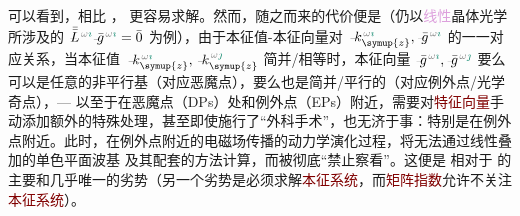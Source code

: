 可以看到，相比 ，  更容易求解。然而，随之而来的代价便是（仍以\textcolor{Plum}{线性}\textcolor{PineGreen}{晶体光学}所涉及的 $\Xint{\mathcolor{gray}{-}}{30}{\bar{\bar{L}}}^{\;\! \mathcolor{gray}{\omega} \textcolor{PineGreen}{\imath}} \Xint{{}^{}_{\mathcolor{gray}{-}}}{10}{\bar{g}}^{\;\!\mathcolor{gray}{\omega} \textcolor{PineGreen}{\imath}} = \bar{0}$ 为例），由于\textcolor{PineGreen}{本征值}-\textcolor{PineGreen}{本征向量}对 $\Xint{\begin{smallmatrix} ~ \\ {}^{}_{\mathcolor{gray}{-}} \\ ~ \end{smallmatrix}}{15}{k}_{\symup{z}}^{\;\! \mathcolor{gray}{\omega} \textcolor{PineGreen}{\imath}}, \Xint{{}^{}_{\mathcolor{gray}{-}}}{10}{\bar{g}}^{\;\!\mathcolor{gray}{\omega} \textcolor{PineGreen}{\imath}}$ 的一一对应关系，当\textcolor{PineGreen}{本征值} $\Xint{\begin{smallmatrix} ~ \\ {}^{}_{\mathcolor{gray}{-}} \\ ~ \end{smallmatrix}}{15}{k}_{\symup{z}}^{\;\! \mathcolor{gray}{\omega} \textcolor{PineGreen}{\imath}}, \Xint{\begin{smallmatrix} ~ \\ {}^{}_{\mathcolor{gray}{-}} \\ ~ \end{smallmatrix}}{15}{k}_{\symup{z}}^{\;\! \mathcolor{gray}{\omega} \textcolor{PineGreen}{\jmath}}$ 简并/相等时，\textcolor{PineGreen}{本征向量} $\Xint{{}^{}_{\mathcolor{gray}{-}}}{10}{\bar{g}}^{\;\!\mathcolor{gray}{\omega} \textcolor{PineGreen}{\imath}}, \Xint{{}^{}_{\mathcolor{gray}{-}}}{10}{\bar{g}}^{\;\!\mathcolor{gray}{\omega} \textcolor{PineGreen}{\jmath}}$ 要么可以是任意的非平行基（对应\textcolor{PineGreen}{恶魔点}），要么也是简并/平行的（对应\textcolor{PineGreen}{例外点}/\textcolor{PineGreen}{光学奇点}），--- 以至于在\textcolor{PineGreen}{恶魔点}（\textcolor{PineGreen}{DPs}）处和\textcolor{PineGreen}{例外点}（\textcolor{PineGreen}{EPs}）附近，需要对\textcolor{Maroon}{特征向量}手动添加额外的特殊处理，甚至即使施行了“外科手术”，也无济于事：特别是在\textcolor{PineGreen}{例外点}附近。此时，在\textcolor{PineGreen}{例外点}附近的电磁场传播的动力学演化过程，将无法通过\textcolor{PineGreen}{线性叠加的单色平面波基}  及其配套的方法计算，而被彻底“禁止察看”。这便是  相对于  的主要和几乎唯一的劣势（另一个劣势是必须求解\textcolor{Maroon}{本征系统}，而\textcolor{Maroon}{矩阵指数}允许不关注\textcolor{Maroon}{本征系统}\cite{zarifiPlaneWaveReflection2014}）。

